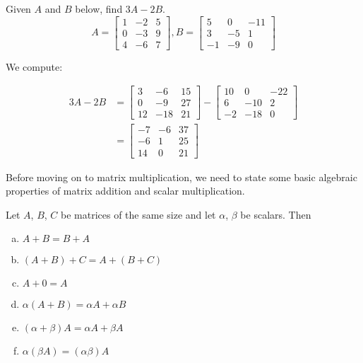 \begin{example}
Given $A$ and $B$ below, find $3A-2B$.
\[
    A=\left[\begin{array}{lll}
    1 & -2 & 5 \\
    0 & -3 & 9 \\
    4 & -6 & 7
    \end{array}\right], B=\left[\begin{array}{ccc}
    5 & 0 & -11 \\
    3 & -5 & 1 \\
    -1 & -9 & 0
    \end{array}\right]
    \]
    
\end{example}

\begin{solution}
    We compute:

    \[
\begin{aligned}
3 A-2 B & =\left[\begin{array}{ccc}
3 & -6 & 15 \\
0 & -9 & 27 \\
12 & -18 & 21
\end{array}\right]-\left[\begin{array}{ccc}
10 & 0 & -22 \\
6 & -10 & 2 \\
-2 & -18 & 0
\end{array}\right] \\
& =\left[\begin{array}{ccc}
-7 & -6 & 37 \\
-6 & 1 & 25 \\
14 & 0 & 21
\end{array}\right]
\end{aligned}
\]
\end{solution}

Before moving on to matrix multiplication, we need to state some basic algebraic properties of matrix addition and scalar multiplication.

\begin{theorem}

    Let $A$, $B$, $C$ be matrices of the same size and let $\alpha$, $\beta$ be scalars. Then
    \begin{enumerate}[(a)]
        \item $A+B=B+A$
        \item $(A+B)+C=A+(B+C)$
        \item $A+0=A$
        \item $\alpha(A+B)=\alpha A+\alpha B$
        \item $(\alpha+\beta) A=\alpha A+\beta A$
        \item $\alpha(\beta A)=(\alpha \beta) A$
    \end{enumerate}
\end{theorem}

